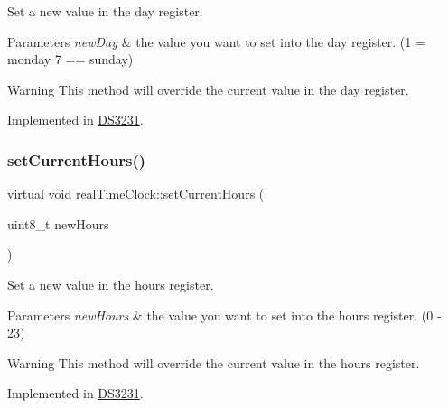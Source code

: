 Set a new value in the day register. 


\begin{DoxyParams}{Parameters}
{\em new\+Day} & the value you want to set into the day register. (1 = monday 7 == sunday) \\
\hline
\end{DoxyParams}
\begin{DoxyWarning}{Warning}
This method will override the current value in the day register. 
\end{DoxyWarning}


Implemented in \mbox{\hyperlink{class_d_s3231_ae43a887db6022008c066a257acd68ae8}{D\+S3231}}.

\mbox{\label{classreal_time_clock_a515d9de6067ae563bff5217da5100a23}} 
\subsubsection{\texorpdfstring{set\+Current\+Hours()}{setCurrentHours()}}
{\footnotesize\ttfamily virtual void real\+Time\+Clock\+::set\+Current\+Hours (\begin{DoxyParamCaption}\item[{uint8\+\_\+t}]{new\+Hours }\end{DoxyParamCaption})\hspace{0.3cm}{\ttfamily [pure virtual]}}



Set a new value in the hours register. 


\begin{DoxyParams}{Parameters}
{\em new\+Hours} & the value you want to set into the hours register. (0 -\/ 23) \\
\hline
\end{DoxyParams}
\begin{DoxyWarning}{Warning}
This method will override the current value in the hours register. 
\end{DoxyWarning}


Implemented in \mbox{\hyperlink{class_d_s3231_ae59c15abcccd8e27eadebcd150db810e}{D\+S3231}}.

\mbox{\label{classreal_time_clock_a52da7366cd5f1e4c270eb87e7298da42}} 
